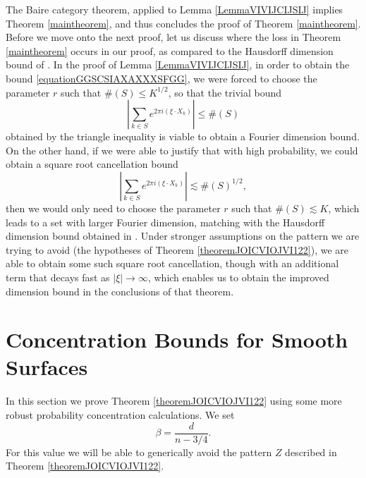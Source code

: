 \documentclass[12pt,reqno]{article}
\numberwithin{equation}{section}
\numberwithin{theorem}{section}
\begin{document}
The Baire category theorem, applied to Lemma \ref{LemmaVIVIJCIJSIJ} implies Theorem \ref{maintheorem}, and thus concludes the proof of Theorem \ref{maintheorem}. Before we move onto the next proof, let us discuss where the loss in Theorem \ref{maintheorem} occurs in our proof, as compared to the Hausdorff dimension bound of \cite{OurPaper}. In the proof of Lemma \ref{LemmaVIVIJCIJSIJ}, in order to obtain the bound \eqref{equationGGSCSIAXAXXXSFGG}, we were forced to choose the parameter $r$ such that $\#(S) \leq K^{1/2}$, so that the trivial bound
%
\begin{equation}
    \left| \sum_{k \in S} e^{2 \pi i (\xi \cdot X_k)} \right| \leq \#(S)
\end{equation}
%
obtained by the triangle inequality is viable to obtain a Fourier dimension bound. On the other hand, if we were able to justify that with high probability, we could obtain a square root cancellation bound
%
\begin{equation}
    \left| \sum_{k \in S} e^{2 \pi i (\xi \cdot X_k)} \right| \lesssim \#(S)^{1/2},
\end{equation}
%
then we would only need to choose the parameter $r$ such that $\#(S) \lesssim K$, which leads to a set with larger Fourier dimension, matching with the Hausdorff dimension bound obtained in \cite{OurPaper}. Under stronger assumptions on the pattern we are trying to avoid (the hypotheses of Theorem \ref{theoremJOICVIOJVI122}), we are able to obtain some such square root cancellation, though with an additional term that decays fast as $|\xi| \to \infty$, which enables us to obtain the improved dimension bound in the conclusions of that theorem.

\section{Concentration Bounds for Smooth Surfaces}

In this section we prove Theorem \ref{theoremJOICVIOJVI122} using some more robust probability concentration calculations. We set
%
\[ \beta = \frac{d}{n-3/4}. \]
%
For this value we will be able to generically avoid the pattern $Z$ described in Theorem \ref{theoremJOICVIOJVI122}.
\end{document}
